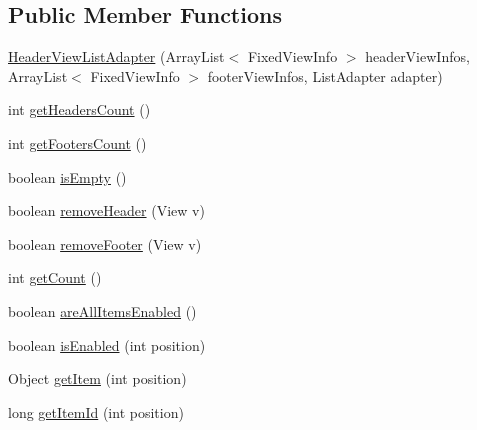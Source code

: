 \subsection*{Public Member Functions}
\begin{DoxyCompactItemize}
\item 
\hyperlink{classit_1_1sephiroth_1_1android_1_1library_1_1widget_1_1_header_view_list_adapter_a9a6766671b4b5188dae3ac64fb3f4059}{Header\+View\+List\+Adapter} (Array\+List$<$ Fixed\+View\+Info $>$ header\+View\+Infos, Array\+List$<$ Fixed\+View\+Info $>$ footer\+View\+Infos, List\+Adapter adapter)
\item 
int \hyperlink{classit_1_1sephiroth_1_1android_1_1library_1_1widget_1_1_header_view_list_adapter_a99e1a63026bc8bf1573ec0fee59b1319}{get\+Headers\+Count} ()
\item 
int \hyperlink{classit_1_1sephiroth_1_1android_1_1library_1_1widget_1_1_header_view_list_adapter_aefa2a6fd1d9b7d9ac56deb79ec4c4857}{get\+Footers\+Count} ()
\item 
boolean \hyperlink{classit_1_1sephiroth_1_1android_1_1library_1_1widget_1_1_header_view_list_adapter_a2e8d1ed0a94d324fb11bd7056dbf5b78}{is\+Empty} ()
\item 
boolean \hyperlink{classit_1_1sephiroth_1_1android_1_1library_1_1widget_1_1_header_view_list_adapter_a873806dfe99c935341835455622ebc79}{remove\+Header} (View v)
\item 
boolean \hyperlink{classit_1_1sephiroth_1_1android_1_1library_1_1widget_1_1_header_view_list_adapter_a27fe1564500a47c01602b98febd10e35}{remove\+Footer} (View v)
\item 
int \hyperlink{classit_1_1sephiroth_1_1android_1_1library_1_1widget_1_1_header_view_list_adapter_a05b220bc4a4849219a175aa61df2c510}{get\+Count} ()
\item 
boolean \hyperlink{classit_1_1sephiroth_1_1android_1_1library_1_1widget_1_1_header_view_list_adapter_a4d80eab1ed07ff462a9362b4925aead8}{are\+All\+Items\+Enabled} ()
\item 
boolean \hyperlink{classit_1_1sephiroth_1_1android_1_1library_1_1widget_1_1_header_view_list_adapter_ad29684b3f3def2d6253597715af09a55}{is\+Enabled} (int position)
\item 
Object \hyperlink{classit_1_1sephiroth_1_1android_1_1library_1_1widget_1_1_header_view_list_adapter_ae657a353680cd132488d17c5ab75b387}{get\+Item} (int position)
\item 
long \hyperlink{classit_1_1sephiroth_1_1android_1_1library_1_1widget_1_1_header_view_list_adapter_a6a17f446087b67704c3156146255bc4e}{get\+Item\+Id} (int position)

\end{DoxyCompactItemize}
